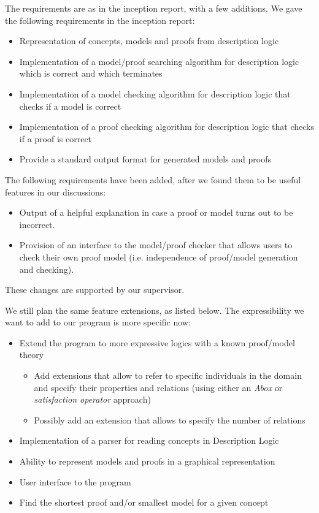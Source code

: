 The requirements are as in the inception report, with a few additions. We gave the following requirements in the inception report:
\begin{itemize}
\item Representation of concepts, models and proofs from description logic
\item Implementation of a model/proof searching algorithm for description logic which is correct and which terminates
\item Implementation of a model checking algorithm for description logic that checks
if a model is correct
\item Implementation of a proof checking algorithm for description logic that checks if a proof is correct
\item Provide a standard output format for generated models and proofs 
\end{itemize}
The following requirements have been added, after we found them to be useful features
in our discussions:
\begin{itemize}
\item Output of a helpful explanation in case a proof or model turns out to be incorrect.
\item Provision of an interface to the model/proof checker that allows users to check their own proof model (i.e. independence of proof/model generation and checking).
\end{itemize}
These changes are supported by our supervisor.

We still plan the same feature extensions, as listed below. The expressibility we want to
add to our program is more specific now:

\begin{itemize}
\item Extend the program to more expressive logics with a known proof/model theory
  \begin{itemize}
    \item Add extensions that allow to refer to specific individuals in the domain and
      specify their properties and relations (using either an \emph{Abox} or \emph{satisfaction operator} approach)
    \item Possibly add an extension that allows to specify the number of relations
  \end{itemize}
\item Implementation of a parser for reading concepts in Description Logic
\item Ability to represent models and proofs in a graphical representation
\item User interface to the program
\item Find the shortest proof and/or smallest model for a given concept
\end{itemize}

